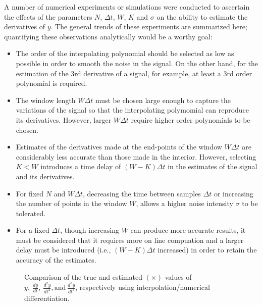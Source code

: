 A number of numerical experiments or simulations
were conducted to ascertain the effects of the
parameters $N$,  $\Delta t$, $W$, $K$ and $\sigma$ on the ability to 
estimate the derivatives
of $y$. 
The general trends of these experiments are summarized here; quantifying
these observations analytically would be a worthy goal:
\begin{itemize}

\item The order of the interpolating polynomial should be selected as low as 
possible in order to smooth the noise in the signal. 
On the other hand, for the estimation of 
the 3rd derivative of a signal, for example, 
at least a 3rd order polynomial is required.

\item The window length $W \Delta t$ must be chosen large enough to
capture the variations of the signal so that the interpolating polymomial 
can reproduce its derivatives.  However, larger $W \Delta t$ require
higher order polynomials to be chosen.

\item Estimates of the derivatives made at the end-points of the window
$W \Delta t$ are considerably less accurate than those made in the interior.
However, selecting $K < W$ introduces a time delay of $(W-K) \Delta t$
in the estimates of the signal and its derivatives. 

\item For fixed $N$ and $W \Delta t$, decreasing the time between samples
$\Delta t$ or increasing
the number of points in the window $W$, allows a higher noise intensity
$\sigma$ to be tolerated.

\item For a fixed $\Delta t$, though increasing $W$ can produce more accurate results,
it must be considered that it requires more on line compuation and a larger
delay must be introduced (i.e., $(W-K)\Delta t$ increased)
in order to retain the accuracy of the estimates. 

\end{itemize}

\begin{figure}[hbt]
\centerline{}
\smallskip
\small
\caption{Comparison of the true and estimated $(\times)$ values of
$y, \ \frac{dy}{dt}, \
\frac{d^2y}{dt^2}, \mbox{and} \
\frac{d^3y}{dt^3}$, respectively using interpolation/numerical differentiation.}
\label{figmplot10}
\end{figure}

